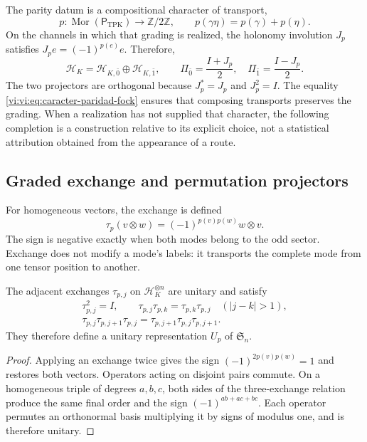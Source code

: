The parity datum is a compositional character of transport,
\begin{equation}
 p:\operatorname{Mor}(\mathsf P_{\mathrm{TPK}})
 \longrightarrow\mathbb Z/2\mathbb Z,
 \qquad p(\gamma\eta)=p(\gamma)+p(\eta).
 \label{vi:vi:eq:caracter-paridad-fock}
\end{equation}
On the channels in which that grading is realized, the
holonomy involution \(J_p\) satisfies
\(J_pe=(-1)^{p(e)}e\). Therefore,
\[
 \mathcal H_K=\mathcal H_{K,\bar0}\oplus\mathcal H_{K,\bar1},
 \qquad \Pi_{\bar0}=\frac{I+J_p}{2},\quad
 \Pi_{\bar1}=\frac{I-J_p}{2}.
\]
The two projectors are orthogonal because \(J_p^*=J_p\) and
\(J_p^2=I\). The equality \eqref{vi:vi:eq:caracter-paridad-fock} ensures
that composing transports preserves the grading. When a realization
has not supplied that character, the following completion is a
construction relative to its explicit choice, not a statistical
attribution obtained from the appearance of a route.

\subsection{Graded exchange and permutation projectors}
\label{vi:vi:subsec:intercambio-graduado}

For homogeneous vectors, the exchange is defined
\begin{equation}
 \tau_p(v\otimes w)=(-1)^{p(v)p(w)}w\otimes v.
 \label{vi:vi:eq:intercambio-graduado}
\end{equation}
The sign is negative exactly when both modes belong to the
odd sector. Exchange does not modify a mode's labels:
it transports the complete mode from one tensor position to another.

\begin{proposition}
\label{vi:vi:prop:permutaciones-graduadas}
The adjacent exchanges \(\tau_{p,j}\) on
\(\mathcal H_K^{\otimes n}\) are unitary and satisfy
\[
\begin{gathered}
 \tau_{p,j}^2=I,\qquad
 \tau_{p,j}\tau_{p,k}=\tau_{p,k}\tau_{p,j}\quad(|j-k|>1),\\
 \tau_{p,j}\tau_{p,j+1}\tau_{p,j}
 =\tau_{p,j+1}\tau_{p,j}\tau_{p,j+1}.
\end{gathered}
\]
They therefore define a unitary representation \(U_p\) of
\(\mathfrak S_n\).
\end{proposition}
\begin{proof}
Applying an exchange twice gives the sign
\((-1)^{2p(v)p(w)}=1\) and restores both vectors. Operators
acting on disjoint pairs commute. On a homogeneous triple
of degrees \(a,b,c\), both sides of the three-exchange
relation produce the same final order and the sign
\((-1)^{ab+ac+bc}\). Each operator permutes an orthonormal basis
multiplying it by signs of modulus one, and is therefore unitary.
\end{proof}

